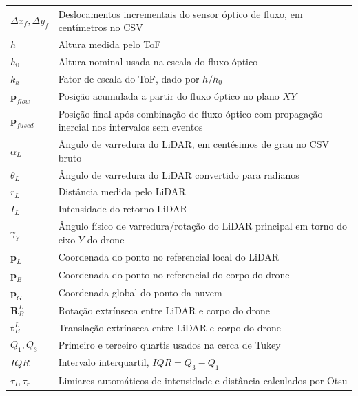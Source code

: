 \begin{tabularx}{\textwidth}{>{\raggedright\arraybackslash}p{3.0cm} >{\raggedright\arraybackslash}X}
$\Delta x_f,\Delta y_f$ & Deslocamentos incrementais do sensor óptico de fluxo, em centímetros no CSV\\
$h$ & Altura medida pelo ToF\\
$h_0$ & Altura nominal usada na escala do fluxo óptico\\
$k_h$ & Fator de escala do ToF, dado por $h/h_0$\\
$\mathbf{p}_{flow}$ & Posição acumulada a partir do fluxo óptico no plano $XY$\\
$\mathbf{p}_{fused}$ & Posição final após combinação de fluxo óptico com propagação inercial nos intervalos sem eventos\\

$\alpha_L$ & Ângulo de varredura do LiDAR, em centésimos de grau no CSV bruto\\
$\theta_L$ & Ângulo de varredura do LiDAR convertido para radianos\\
$r_L$ & Distância medida pelo LiDAR\\
$I_L$ & Intensidade do retorno LiDAR\\
$\gamma_Y$ & Ângulo físico de varredura/rotação do LiDAR principal em torno do eixo $Y$ do drone\\
$\mathbf{p}_L$ & Coordenada do ponto no referencial local do LiDAR\\
$\mathbf{p}_B$ & Coordenada do ponto no referencial do corpo do drone\\
$\mathbf{p}_G$ & Coordenada global do ponto da nuvem\\
$\mathbf{R}_{B}^{L}$ & Rotação extrínseca entre LiDAR e corpo do drone\\
$\mathbf{t}_{B}^{L}$ & Translação extrínseca entre LiDAR e corpo do drone\\

$Q_1,Q_3$ & Primeiro e terceiro quartis usados na cerca de Tukey\\
$IQR$ & Intervalo interquartil, $IQR=Q_3-Q_1$\\
$\tau_I,\tau_r$ & Limiares automáticos de intensidade e distância calculados por Otsu\\
\end{tabularx}
